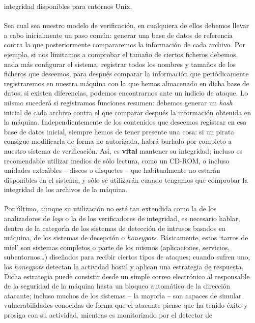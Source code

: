 integridad disponibles para entornos Unix.\\
\\Sea cual sea nuestro modelo de verificaci\'on, en cualquiera de ellos debemos
llevar a cabo inicialmente un paso com\'un: generar una base de datos de 
referencia contra la que posteriormente compararemos la informaci\'on de cada 
archivo. Por ejemplo, si nos limitamos a comprobar el tama\~no de ciertos 
ficheros debemos, nada m\'as configurar el sistema, registrar todos los nombres
y tama\~nos de los ficheros que deseemos, para despu\'es comparar la 
informaci\'on que peri\'odicamente registraremos en nuestra m\'aquina con la
que hemos almacenado en dicha base de datos; si existen diferencias, podemos
encontrarnos ante un indicio de ataque. Lo mismo suceder\'a si registramos 
funciones resumen: debemos generar un {\it hash} inicial de cada archivo contra
el que comparar despu\'es la informaci\'on obtenida en la m\'aquina. 
Independientemente de los contenidos que deseemos registrar en esa base de datos
inicial, siempre hemos de tener presente una cosa: si un pirata consigue 
modificarla de forma no autorizada, habr\'a burlado por completo a nuestro 
sistema de verificaci\'on. As\'{\i}, es {\bf vital} mantener su integridad;
incluso es recomendable utilizar medios de s\'olo lectura, como un CD-ROM, o
incluso unidades extra\'{\i}bles -- discos o disquetes -- que habitualmente no
estar\'an disponibles en el sistema, y s\'olo se utilizar\'an cuando tengamos
que comprobar la integridad de los archivos de la m\'aquina.\\
\\Por \'ultimo, aunque su utilizaci\'on no est\'e tan extendida como la de los
analizadores de {\it logs} o la de los verificadores de integridad, es necesario
hablar, dentro de la categor\'{\i}a de los sistemas de detecci\'on de intrusos
basados en m\'aquina, de los sistemas de decepci\'on o {\it honeypots}. 
B\'asicamente, estos `tarros de miel' son sistemas completos o parte de los
mismos (aplicaciones, servicios, subentornos\ldots) dise\~nados para recibir
ciertos tipos de ataques; cuando sufren uno, los {\it honeypots} detectan la
actividad hostil y aplican una estrategia de respuesta. Dicha estrategia puede
consistir desde un simple correo electr\'onico al responsable de la seguridad 
de la m\'aquina hasta un bloqueo autom\'atico de la direcci\'on atacante;
incluso muchos de los sistemas -- la mayor\'{\i}a -- son capaces de simular 
vulnerabilidades conocidas de forma que el atacante piense que ha tenido 
\'exito y prosiga con su actividad, mientras es monitorizado por el detector de

